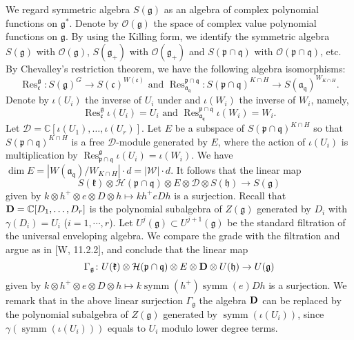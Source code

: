 \documentclass[a4paper]{amsart}
\theoremstyle{plain}
\theoremstyle{definition}
\def\symm{\operatorname{symm}}
\def\Res{\operatorname{Res}}
\newcommand{\fra}{\mathfrak{a}}
\newcommand{\frc}{\mathfrak{c}}
\newcommand{\frg}{\mathfrak{g}}
\newcommand{\frh}{\mathfrak{h}}
\newcommand{\frk}{\mathfrak{k}}
\newcommand{\frp}{\mathfrak{p}}
\newcommand{\frq}{\mathfrak{q}}
\newcommand{\bbC}{\mathbb{C}}
\newcommand{\caD}{\mathcal{D}}
\newcommand{\caH}{\mathcal{H}}
\newcommand{\caO}{\mathcal{O}}
\newcommand{\caW}{\mathcal{W}}
\begin{document}
We regard symmetric algebra $S(\frg)$ as an algebra of complex polynomial functions on $\frg^*$.
Denote by $\caO(\frg)$ the space of complex value polynomial functions on $\frg$. By using the Killing form,
we identify the symmetric algebra $S(\frg)$ with $\caO(\frg)$,
$S(\frg_+)$ with $\caO(\frg_+)$ and $S(\frp\cap\frq)$ with $\caO(\frp\cap\frq)$, etc.
By Chevalley's restriction theorem, we have the following algebra isomorphisms:
$$\Res^\frg_\frc\colon S(\frg)^G\rightarrow S(\frc)^{W(\frc)} \text{ and }
\Res^{\frp\cap\frq}_{\fra_\frq}\colon S(\frp\cap\frq)^{K\cap H}\rightarrow S(\fra_\frq)^{W_{K\cap H}}.$$
Denote by $\iota(U_i)$ the inverse of $U_i$ under
and $\iota(W_i)$ the inverse of $W_i$,  namely,
$$\Res^\frg_\frc \iota(U_i)=U_i  \text{ and } \Res^{\frp\cap\frq}_{\fra_\frq}\iota(W_i)=W_i.$$
Let $\caD=\bbC[\iota(U_1),\ldots ,\iota(U_r)]$.
Let $E$ be a subspace of $S(\frp\cap\frq)^{K\cap H}$
so that $S(\frp\cap\frq)^{K\cap H}$ is a free $\caD$-module generated by $E$, where the
action of $\iota(U_i)$ is multiplication by $\Res^\frg_{\frp\cap\frq}\iota(U_i)=\iota(W_i)$.
We have $\dim E = |W(\fra_\frq)/W_{K\cap H}|\cdot d = |\caW|\cdot d$.
It follows that the linear map
$$ S(\frk)\otimes \caH(\frp\cap\frq)\otimes E\otimes {\caD}\otimes S(\frh)\rightarrow S(\frg) $$
given by $k\otimes h^+\otimes e \otimes D \otimes h\mapsto k h^+eDh$ is a surjection.
Recall that
${\bf D}=\bbC[D_1,\ldots ,D_r]$ is the polynomial subalgebra of $Z(\frg)$ generated
by $D_i$ with $\gamma(D_i)=U_i$ ($i=1,\cdots, r$).
Let $U^j(\frg)\subset U^{j+1}(\frg)$ be the standard filtration of the universal enveloping algebra.
We compare the grade with the filtration and argue as in [W, 11.2.2], and
conclude that the linear map
$$ \Gamma_\frg\colon U(\frk)\otimes \caH(\frp\cap\frq)\otimes E\otimes {\bf D}\otimes U(\frh)\rightarrow U(\frg) $$
given by $k\otimes h^+\otimes e \otimes D \otimes h\mapsto k \symm(h^+)\symm(e)Dh$ is a surjection.
We remark that in the above linear surjection $\Gamma_\frg$ the algebra $\bf D$ 
can be replaced by the polynomial subalgebra of $Z(\frg)$ generated by
$\symm (\iota(U_i))$, since $\gamma(\symm (\iota(U_i)))$ equals to $U_i$ modulo lower degree terms.
\end{document}
